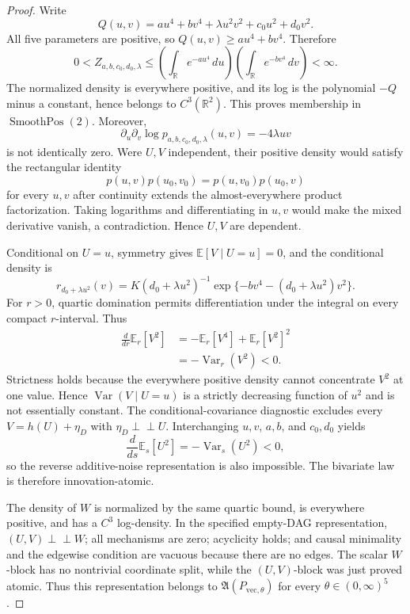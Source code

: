 \documentclass{article}
\begin{document}
\begin{proof}
Write
\[
 Q(u,v)=au^4+bv^4+\lambda u^2v^2+c_0u^2+d_0v^2.
\]
All five parameters are positive, so \(Q(u,v)\geq au^4+bv^4\).  Therefore
\[
 0<Z_{a,b,c_0,d_0,\lambda}
 \leq\left(\int_{\mathbb R}e^{-au^4}\,du\right)
      \left(\int_{\mathbb R}e^{-bv^4}\,dv\right)<\infty.
\]
The normalized density is everywhere positive, and its log is the polynomial \(-Q\) minus a constant, hence belongs to \(C^3(\mathbb R^2)\).  This proves membership in \(\operatorname{SmoothPos}(2)\).  Moreover,
\[
 \partial_u\partial_v\log p_{a,b,c_0,d_0,\lambda}(u,v)=-4\lambda uv
\]
is not identically zero.  Were \(U,V\) independent, their positive density would satisfy the rectangular identity
\[
 p(u,v)p(u_0,v_0)=p(u,v_0)p(u_0,v)
\]
for every \(u,v\) after continuity extends the almost-everywhere product factorization.  Taking logarithms and differentiating in \(u,v\) would make the mixed derivative vanish, a contradiction.  Hence \(U,V\) are dependent.

Conditional on \(U=u\), symmetry gives \(\mathbb E[V\mid U=u]=0\), and the conditional density is
\[
 r_{d_0+\lambda u^2}(v)
 =K(d_0+\lambda u^2)^{-1}\exp\{-bv^4-(d_0+\lambda u^2)v^2\}.
\]
For \(r>0\), quartic domination permits differentiation under the integral on every compact \(r\)-interval.  Thus
\[
 \begin{aligned}
 \frac{d}{dr}\mathbb E_r[V^2]
 &=-\mathbb E_r[V^4]+\mathbb E_r[V^2]^2\\
 &=-\operatorname{Var}_r(V^2)<0.
 \end{aligned}
\]
Strictness holds because the everywhere positive density cannot concentrate \(V^2\) at one value.  Hence \(\operatorname{Var}(V\mid U=u)\) is a strictly decreasing function of \(u^2\) and is not essentially constant.  The conditional-covariance diagnostic excludes every \(V=h(U)+\eta_D\) with \(\eta_D\perp\!\!\!\perp U\).  Interchanging \(u,v\), \(a,b\), and \(c_0,d_0\) yields
\[
 \frac{d}{ds}\mathbb E_s[U^2]=-\operatorname{Var}_s(U^2)<0,
\]
so the reverse additive-noise representation is also impossible.  The bivariate law is therefore innovation-atomic.

The density of \(W\) is normalized by the same quartic bound, is everywhere positive, and has a \(C^3\) log-density.  In the specified empty-DAG representation, \((U,V)\perp\!\!\!\perp W\); all mechanisms are zero; acyclicity holds; and causal minimality and the edgewise condition are vacuous because there are no edges.  The scalar \(W\)-block has no nontrivial coordinate split, while the \((U,V)\)-block was just proved atomic.  Thus this representation belongs to \(\mathfrak A(P_{\mathrm{vec},\theta})\) for every \(\theta\in(0,\infty)^5\).
\end{proof}
\end{document}
